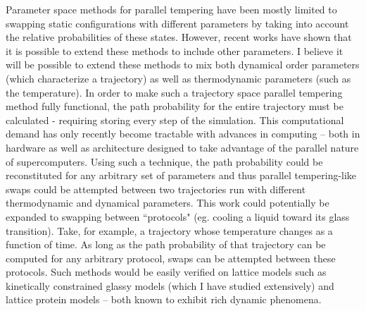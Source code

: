 \documentclass[11pt]{article}
\newcommand{\kB}{k_{\mathrm{B}}}
\begin{document}
Parameter space methods for parallel tempering %
have been mostly limited to swapping static configurations with different parameters by taking into account the relative probabilities of these states.  However, recent works have shown that it is possible to extend these methods to include other parameters. I believe it will be possible to extend these methods to mix both dynamical order parameters (which characterize a trajectory) as well as thermodynamic parameters (such as the temperature).  In order to make such a trajectory space parallel tempering method fully functional, the path probability for the entire trajectory must be calculated - requiring storing every step of the simulation.  This computational demand has only recently become tractable with advances in computing -- both in hardware as well as architecture designed to take advantage of the parallel nature of supercomputers.   Using such a technique, the path probability could be reconstituted for any arbitrary set of parameters and thus parallel tempering-like swaps could be attempted between two trajectories run with different thermodynamic and dynamical parameters.  This work could potentially be expanded to swapping between ``protocols" (eg. cooling a liquid toward its glass transition). Take, for example, a trajectory whose temperature changes as a function of time. As long as the path probability of that trajectory can be computed for any arbitrary protocol, swaps can be attempted between these protocols.  Such methods would be easily verified on lattice models such as kinetically constrained glassy models (which I have studied extensively) and lattice protein models -- both known to exhibit rich dynamic phenomena.  

\end{document}

